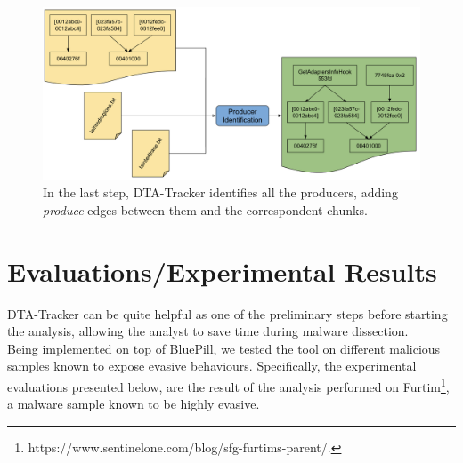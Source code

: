 \documentclass[LaM,binding=0.6cm]{sapthesis}
\begin{document}
\begin{figure}[h!]
\centering
\includegraphics[scale=.45]{images/dtatracker6}
\caption{In the last step, DTA-Tracker identifies all the producers, adding \textit{produce} edges between them and the correspondent chunks.}
\end{figure}

\section{Evaluations/Experimental Results}
\label{sec:evaluations}
DTA-Tracker can be quite helpful as one of the preliminary steps before starting the analysis, allowing the analyst to save time during malware dissection.\\
Being implemented on top of BluePill, we tested the tool on different malicious samples known to expose evasive behaviours. Specifically, the experimental evaluations presented below, are the result of the analysis performed on Furtim\footnote{https://www.sentinelone.com/blog/sfg-furtims-parent/.}, a malware sample known to be highly evasive.
\end{document}
